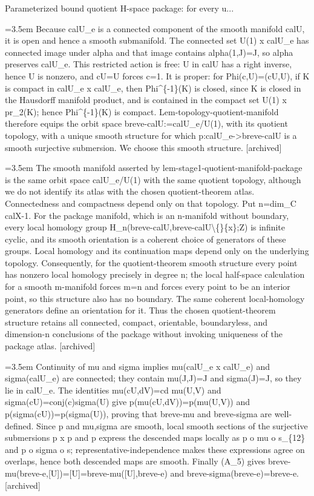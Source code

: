 \documentclass{article}
\newcommand{\step}[1]{\par\noindent\hangindent=3.5em\hangafter=1%
  \makebox[3.5em][l]{\textbf{#1.}}}
\newcommand{\steptag}[1]{\hfill{\small\textsf{[#1]}}}
\begin{document}
\begin{proofbox}{Parameterized bound quotient H-space package: for every u...}
\step{1.3.1.1} Because calU\_e is a connected component of the smooth manifold calU, it is open and hence a smooth submanifold. The connected set U(1) x calU\_e has connected image under alpha and that image contains alpha(1,J)=J, so alpha preserves calU\_e. This restricted action is free: U in calU has a right inverse, hence U is nonzero, and cU=U forces c=1. It is proper: for Phi(c,U)=(cU,U), if K is compact in calU\_e x calU\_e, then Phi\textasciicircum{}\{-1\}(K) is closed, since K is closed in the Hausdorff manifold product, and is contained in the compact set U(1) x pr\_2(K); hence Phi\textasciicircum{}\{-1\}(K) is compact. Lem-topology-quotient-manifold therefore equips the orbit space breve-calU:=calU\_e/U(1), with its quotient topology, with a unique smooth structure for which p:calU\_e->breve-calU is a smooth surjective submersion. We choose this smooth structure. \steptag{archived} \\[4pt]
\step{1.3.1.2} The smooth manifold asserted by lem-stage1-quotient-manifold-package is the same orbit space calU\_e/U(1) with the same quotient topology, although we do not identify its atlas with the chosen quotient-theorem atlas. Connectedness and compactness depend only on that topology. Put n=dim\_C calX-1. For the package manifold, which is an n-manifold without boundary, every local homology group H\_n(breve-calU,breve-calU\textbackslash\{\}\{x\};Z) is infinite cyclic, and its smooth orientation is a coherent choice of generators of these groups. Local homology and its continuation maps depend only on the underlying topology. Consequently, for the quotient-theorem smooth structure every point has nonzero local homology precisely in degree n; the local half-space calculation for a smooth m-manifold forces m=n and forces every point to be an interior point, so this structure also has no boundary. The same coherent local-homology generators define an orientation for it. Thus the chosen quotient-theorem structure retains all connected, compact, orientable, boundaryless, and dimension-n conclusions of the package without invoking uniqueness of the package atlas. \steptag{archived} \\[4pt]
\step{1.3.1.3} Continuity of mu and sigma implies mu(calU\_e x calU\_e) and sigma(calU\_e) are connected; they contain mu(J,J)=J and sigma(J)=J, so they lie in calU\_e. The identities mu(cU,dV)=cd mu(U,V) and sigma(cU)=conj(c)sigma(U) give p(mu(cU,dV))=p(mu(U,V)) and p(sigma(cU))=p(sigma(U)), proving that breve-mu and breve-sigma are well-defined. Since p and mu,sigma are smooth, local smooth sections of the surjective submersions p x p and p express the descended maps locally as p o mu o s\_\{12\} and p o sigma o s; representative-independence makes these expressions agree on overlaps, hence both descended maps are smooth. Finally (A\_5) gives breve-mu(breve-e,[U])=[U]=breve-mu([U],breve-e) and breve-sigma(breve-e)=breve-e. \steptag{archived} \\[4pt]

\end{proofbox}
\end{document}

